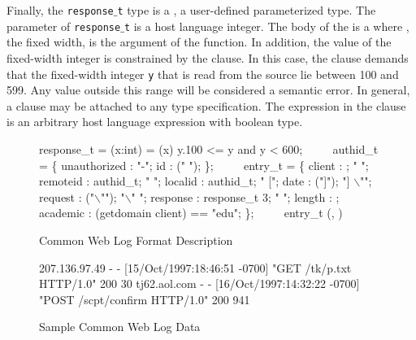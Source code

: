 Finally, the {\tt response$\_$t} type is a \Pfun, a user-defined
parameterized type.  The parameter of {\tt response$\_$t} is a host
language integer.  The body of the \Pfun{} is a 
where , the fixed width, is the argument of the function.  In
addition, the value of the fixed-width integer is constrained by the
\Pwhere{} clause.  In this case, the \Pwhere{} clause demands that
the fixed-width integer {\tt y} that is read from the source lie 
between 100 and 599.
Any value outside this range will be considered a semantic error.
In general, a \Pwhere{} clause may be attached to 
any type specification.  The expression in the \Pwhere{} clause
is an arbitrary host language expression with boolean type.


\begin{figure}

\begin{code}
response\_t =
  \Pfun(x:int) =
    (x) \Pwhere{} y.100 <= y and y < 600;
\(\qquad\)
authid\_t = \Punion{} \{
  unauthorized : "-";
  id           : \Pstring (" ");
\};
\(\qquad\)
entry\_t = \Pstruct{} \{
  client   : \Pip{};             " ";
  remoteid : authid\_t;        " ";
  localid  : authid\_t;        " [";
  date     : \Pdate("]");      "] \(\backslash\)"";
  request  : \Pstring("\(\backslash\)"");   "\(\backslash\)" ";
  response : response\_t 3;    " "; 
  length   : \Puint{};
  academic : \Pcompute 
              (getdomain client) == "edu";
\};
\(\qquad\)
entry\_t \Parray{}(\Peor, \Peof)
\end{code}

\caption{\ipads{} Common Web Log Format Description}
\label{fig:ipads-clf}

\end{figure}

\begin{figure*}
\begin{code}
 207.136.97.49 - - [15/Oct/1997:18:46:51 -0700] "GET /tk/p.txt HTTP/1.0" 200 30
 tj62.aol.com - - [16/Oct/1997:14:32:22 -0700] "POST /scpt/confirm HTTP/1.0" 200 941
\end{code}
\caption{Sample Common Web Log Data}
\label{fig:ipads-clf-data}

\end{figure*}



